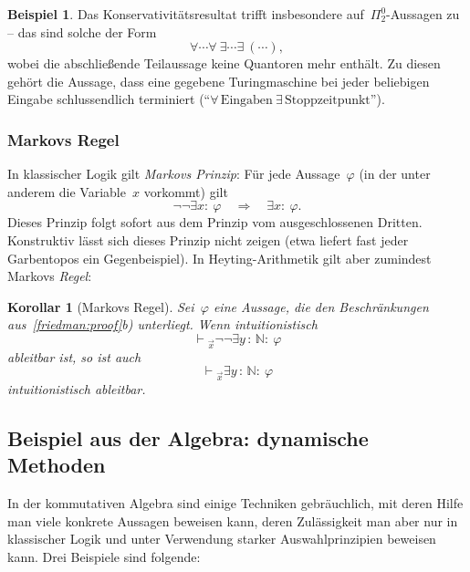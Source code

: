 \documentclass[a4paper,ngerman,12pt]{scrartcl}
\theoremstyle{definition}
\newtheorem{bsp}[defn]{Beispiel}
\theoremstyle{plain}
\newtheorem{kor}[defn]{Korollar}
\theoremstyle{remark}
\newcommand{\NN}{\mathbb{N}}
\newcommand{\seq}[1]{\mathrel{\vdash\!\!\!_{#1}}}
\renewcommand{\_}{\mathpunct{.}\,}
\newcommand{\?}{\,{:}\,}
\begin{document}
\begin{bsp}Das Konservativitätsresultat trifft insbesondere
auf~$\Pi^0_2$-Aussagen zu -- das sind solche der Form
\[ \forall \cdots \forall\ \exists \cdots \exists\ (\cdots), \]
wobei die abschließende Teilaussage keine Quantoren mehr enthält. Zu diesen
gehört die Aussage, dass eine gegebene Turingmaschine bei jeder
beliebigen Eingabe schlussendlich terminiert ("`$\forall\,\text{Eingaben}\
\exists\,\text{Stoppzeitpunkt}$"').
\end{bsp}


\subsubsection*{Markovs Regel}

In klassischer Logik gilt \emph{Markovs Prinzip}: Für jede Aussage~$\varphi$
(in der unter anderem die Variable~$x$ vorkommt) gilt
\[ \neg\neg \exists x{:}\ \varphi \quad\Longrightarrow\quad
  \exists x{:}\ \varphi. \]
Dieses Prinzip folgt sofort aus dem Prinzip vom ausgeschlossenen Dritten.
Konstruktiv lässt sich dieses Prinzip nicht zeigen (etwa liefert fast jeder
Garbentopos ein Gegenbeispiel). In Heyting-Arithmetik gilt aber zumindest
Markovs \emph{Regel}:

\begin{kor}[Markovs Regel]Sei~$\varphi$ eine Aussage, die den Beschränkungen
aus~\ref{friedman:proof}b) unterliegt. Wenn intuitionistisch
\[ \seq{\vec x} \neg\neg\exists y\?\NN{:}\ \varphi \]
ableitbar ist, so ist auch
\[ \seq{\vec x} \exists y\?\NN{:}\ \varphi \]
intuitionistisch ableitbar.\end{kor}




\subsection{Beispiel aus der Algebra: dynamische Methoden}

In der kommutativen Algebra sind einige Techniken gebräuchlich, mit deren Hilfe
man viele konkrete Aussagen beweisen kann, deren Zulässigkeit man aber nur
in klassischer Logik und unter Verwendung starker Auswahlprinzipien beweisen
kann. Drei Beispiele sind folgende:
\end{document}
